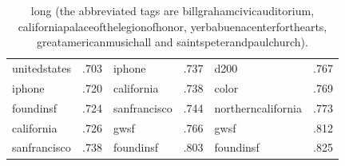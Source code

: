 \begin{table}[ht]
\begin{tabular}{lclclc}
unitedstates     & .703 & iphone                 & .737 & d200                & .767 \\
iphone           & .720 & california             & .738 & color               & .769 \\
foundinsf        & .724 & sanfrancisco           & .744 & northerncalifornia  & .773 \\
california       & .726 & gwsf                   & .766 & gwsf                & .812 \\
sanfrancisco     & .738 & foundinsf              & .803 & foundinsf           & .825 \\
\bottomrule
\end{tabular}
\caption{long (the abbreviated tags are \textsf{billgrahamcivicauditorium},
	\textsf{californiapalaceofthelegionofhonor},
	\textsf{yerbabuenacenterforthearts}, \textsf{greatamericanmusichall} and
\textsf{saintspeterandpaulchurch}).\label{tab:entropy}}
\end{table}
